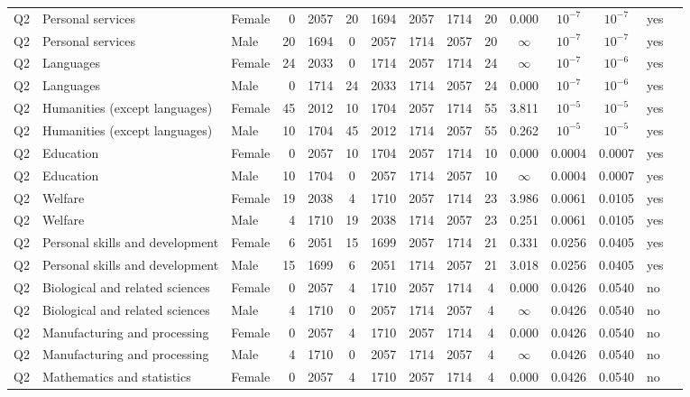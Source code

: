 \begin{longtable}{lllrcccccccccll}
Q2 & Personal services & Female & 0 & 2057 & 20 & 1694 & 2057 & 1714 & 20 & 0.000 & $10^{-7}$ & $10^{-7}$ & yes \\
Q2 & Personal services & Male & 20 & 1694 & 0 & 2057 & 1714 & 2057 & 20 & $\infty$ & $10^{-7}$ & $10^{-7}$ & yes \\
Q2 & Languages & Female & 24 & 2033 & 0 & 1714 & 2057 & 1714 & 24 & $\infty$ & $10^{-7}$ & $10^{-6}$ & yes \\
Q2 & Languages & Male & 0 & 1714 & 24 & 2033 & 1714 & 2057 & 24 & 0.000 & $10^{-7}$ & $10^{-6}$ & yes \\
Q2 & Humanities (except languages) & Female & 45 & 2012 & 10 & 1704 & 2057 & 1714 & 55 & 3.811 & $10^{-5}$ & $10^{-5}$ & yes \\
Q2 & Humanities (except languages) & Male & 10 & 1704 & 45 & 2012 & 1714 & 2057 & 55 & 0.262 & $10^{-5}$ & $10^{-5}$ & yes \\
Q2 & Education & Female & 0 & 2057 & 10 & 1704 & 2057 & 1714 & 10 & 0.000 & 0.0004 & 0.0007 & yes \\
Q2 & Education & Male & 10 & 1704 & 0 & 2057 & 1714 & 2057 & 10 & $\infty$ & 0.0004 & 0.0007 & yes \\
Q2 & Welfare & Female & 19 & 2038 & 4 & 1710 & 2057 & 1714 & 23 & 3.986 & 0.0061 & 0.0105 & yes \\
Q2 & Welfare & Male & 4 & 1710 & 19 & 2038 & 1714 & 2057 & 23 & 0.251 & 0.0061 & 0.0105 & yes \\
Q2 & Personal skills and development & Female & 6 & 2051 & 15 & 1699 & 2057 & 1714 & 21 & 0.331 & 0.0256 & 0.0405 & yes \\
Q2 & Personal skills and development & Male & 15 & 1699 & 6 & 2051 & 1714 & 2057 & 21 & 3.018 & 0.0256 & 0.0405 & yes \\
Q2 & Biological and related sciences & Female & 0 & 2057 & 4 & 1710 & 2057 & 1714 & 4 & 0.000 & 0.0426 & 0.0540 & no \\
Q2 & Biological and related sciences & Male & 4 & 1710 & 0 & 2057 & 1714 & 2057 & 4 & $\infty$ & 0.0426 & 0.0540 & no \\
Q2 & Manufacturing and processing & Female & 0 & 2057 & 4 & 1710 & 2057 & 1714 & 4 & 0.000 & 0.0426 & 0.0540 & no \\
Q2 & Manufacturing and processing & Male & 4 & 1710 & 0 & 2057 & 1714 & 2057 & 4 & $\infty$ & 0.0426 & 0.0540 & no \\
Q2 & Mathematics and statistics & Female & 0 & 2057 & 4 & 1710 & 2057 & 1714 & 4 & 0.000 & 0.0426 & 0.0540 & no \\

\end{longtable}
